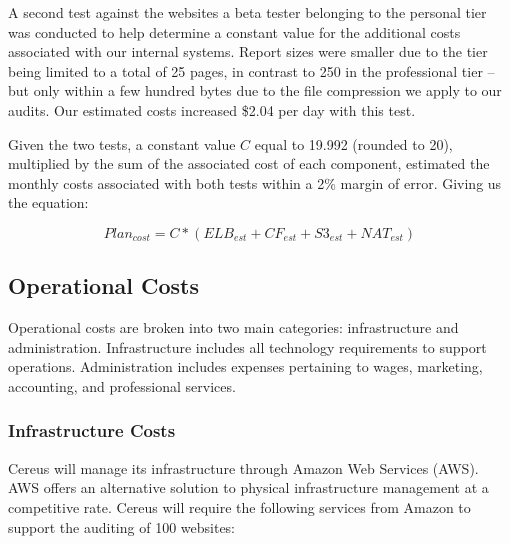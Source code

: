 A second test against the websites a beta tester belonging to the personal tier was conducted to help determine a constant value for the additional costs associated with our internal systems. Report sizes were smaller due to the tier being limited to a total of 25 pages, in contrast to 250 in the professional tier -- but only within a few hundred bytes due to the file compression we apply to our audits. Our estimated costs increased \$2.04 per day with this test.

Given the two tests, a constant value \(C\) equal to 19.992 (rounded to 20), multiplied by the sum of the associated cost of each component, estimated the monthly costs associated with both tests within a 2\% margin of error. Giving us the equation:

\[
  Plan_{cost} = C * (ELB_{est} + CF_{est} + S3_{est} + NAT_{est})
\]


\subsection{Operational Costs} \label{section.operational.costs}

Operational costs are broken into two main categories: infrastructure and administration. Infrastructure includes all technology requirements to support operations. Administration includes expenses pertaining to wages, marketing, accounting, and professional services.

\subsubsection{Infrastructure Costs}

Cereus will manage its infrastructure through Amazon Web Services (AWS). AWS offers an alternative solution to physical infrastructure management at a competitive rate. Cereus will require the following services from Amazon to support the auditing of 100 websites:

